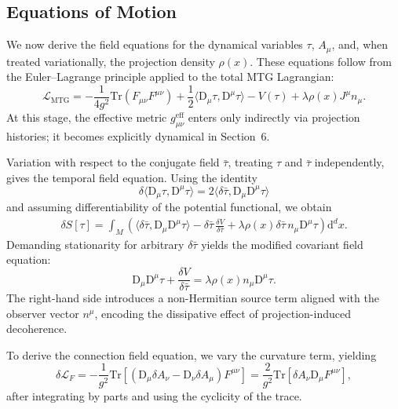 \documentclass[11pt]{article}
\begin{document}
\subsection{Equations of Motion}

We now derive the field equations for the dynamical variables \( \tau \), \( A_\mu \), and, when treated variationally, the projection density \( \rho(x) \). These equations follow from the Euler--Lagrange principle applied to the total MTG Lagrangian:
\begin{equation}
\mathcal{L}_{\mathrm{MTG}} = -\frac{1}{4g^2} \mathrm{Tr}(F_{\mu\nu} F^{\mu\nu}) + \frac{1}{2} \langle \mathrm{D}_\mu \tau, \mathrm{D}^\mu \tau \rangle - V(\tau) + \lambda \rho(x) J^\mu n_\mu.
\end{equation}
At this stage, the effective metric \( g^{\mathrm{eff}}_{\mu\nu} \) enters only indirectly via projection histories; it becomes explicitly dynamical in Section~6.

Variation with respect to the conjugate field \( \bar{\tau} \), treating \( \tau \) and \( \bar{\tau} \) independently, gives the temporal field equation. Using the identity
\[
\delta \langle \mathrm{D}_\mu \tau, \mathrm{D}^\mu \tau \rangle = 2 \langle \delta \bar{\tau}, \mathrm{D}_\mu \mathrm{D}^\mu \tau \rangle
\]
and assuming differentiability of the potential functional, we obtain
\begin{align}
\delta S[\tau] = \int_M \left( \langle \delta \bar{\tau}, \mathrm{D}_\mu \mathrm{D}^\mu \tau \rangle - \delta \bar{\tau} \, \frac{\delta V}{\delta \bar{\tau}} + \lambda \rho(x) \delta \bar{\tau} \, n_\mu \mathrm{D}^\mu \tau \right) \mathrm{d}^d x.
\end{align}
Demanding stationarity for arbitrary \( \delta \bar{\tau} \) yields the modified covariant field equation:
\begin{equation}
\mathrm{D}_\mu \mathrm{D}^\mu \tau + \frac{\delta V}{\delta \bar{\tau}} = \lambda \rho(x) n_\mu \mathrm{D}^\mu \tau.
\end{equation}
The right-hand side introduces a non-Hermitian source term aligned with the observer vector \( n^\mu \), encoding the dissipative effect of projection-induced decoherence.

To derive the connection field equation, we vary the curvature term, yielding
\[
\delta \mathcal{L}_F = -\frac{1}{g^2} \mathrm{Tr} \left[ (\mathrm{D}_\mu \delta A_\nu - \mathrm{D}_\nu \delta A_\mu) F^{\mu\nu} \right] = \frac{2}{g^2} \mathrm{Tr} \left[ \delta A_\nu \mathrm{D}_\mu F^{\mu\nu} \right],
\]
after integrating by parts and using the cyclicity of the trace.
\end{document}
